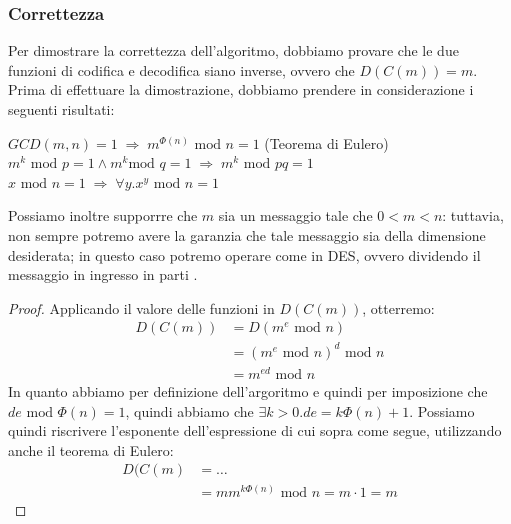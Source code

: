 \subsubsection{Correttezza}
Per dimostrare la correttezza dell'algoritmo, dobbiamo provare che le due funzioni
di codifica e decodifica siano inverse, ovvero che $D(C(m))=m$. Prima di 
effettuare la dimostrazione, dobbiamo prendere in considerazione i seguenti
risultati:
\begin{itemize}
\diam $GCD(m,n)=1\;\Rightarrow\; m^{\Phi(n)}\text{ mod }n=1$ (Teorema di Eulero)
\diam $m^k\text{ mod }p=1\wedge m^k\text{mod }q=1\;\Rightarrow\; m^k\text{ mod }pq=1$
\diam $x\text{ mod }n=1\;\Rightarrow\; \forall y. x^y\text{ mod }n=1$
\end{itemize}
Possiamo inoltre supporrre che $m$ sia un messaggio tale che $0<m<n$: tuttavia,
non sempre potremo avere la garanzia che tale messaggio sia della dimensione
desiderata; in questo caso potremo operare come in DES, ovvero dividendo il 
messaggio in ingresso in parti .
\begin{proof}
Applicando il valore delle funzioni in $D(C(m))$, otterremo:
\[\begin{split}
D(C(m))&=D(m^e\text{ mod }n)\\
       &=(m^e\text{ mod }n)^d\text{ mod }n\\
       &= m^{ed}\text{ mod }n
\end{split}\]
In quanto abbiamo per definizione dell'argoritmo e quindi per imposizione che
$de\text{ mod }\Phi(n)=1$, quindi abbiamo che $\exists k>0. de = k\Phi(n)+1$.
Possiamo quindi riscrivere l'esponente dell'espressione di cui sopra come segue,
utilizzando anche il teorema di Eulero:
\[\begin{split} 
D(C(m)&=\dots\\
      &=mm^{k\Phi(n)}\text{ mod }n=m\cdot 1=m
\end{split}\]
\end{proof}
